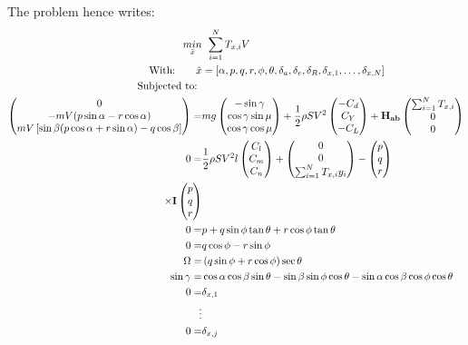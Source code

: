 The problem hence writes:
\begin{align}
\underset{\tilde{x}}{min} & \: \:\sum_{i=1}^{N} T_{x,i} V\\
\text{With:}\qquad \tilde{x}&=[\alpha, p, q, r, \phi, \theta, \delta_a, \delta_e, \delta_R, \delta_{x,1}, \dots, \delta_{x,N}]\\
\text{Subjected to: }&\notag \\
\begin{pmatrix}
0 \\
-mV(p\sin\alpha - r\cos\alpha)\\
mV\left[\sin\beta (p\cos\alpha + r\sin\alpha) - q\cos\beta\right]
\end{pmatrix}
= & mg
\begin{pmatrix}
-\sin\gamma\\
\cos\gamma \sin\mu\\
\cos\gamma \cos\mu	
\end{pmatrix}
+ \frac{1}{2} \rho S V^2
\begin{pmatrix}
-C_d\\
C_Y\\
-C_L
\end{pmatrix}
+ \mathbf{H_{ab}} 
\begin{pmatrix}
\sum_{i=1}^{N} T_{x,i}\\
0\\
0
\end{pmatrix} \\
0 =& \frac{1}{2} \rho S V^2 l
\begin{pmatrix}
C_l\\
C_m\\
C_n
\end{pmatrix}
+
\begin{pmatrix}
0\\
0\\
\sum_{i=1}^{N} T_{x,i} y_i
\end{pmatrix} -
\begin{pmatrix}
p\\
q\\
r
\end{pmatrix}\\
\times \textbf{I}
\begin{pmatrix}
p\\
q\\
r
\end{pmatrix}\\
0= & p + q\sin\phi \tan\theta + r \cos\phi \tan\theta\\
0= & q\cos\phi -r\sin \phi\\
\Omega = & \left( q \sin \phi + r \cos \phi \right) \sec \theta \\
\sin \gamma = & \cos\alpha\cos\beta\sin\theta - \sin\beta\sin\phi\cos\theta - \sin\alpha\cos\beta\cos\phi\cos\theta\\
0 = & \delta_{x,1}\\
\vdots\notag\\
0 = & \delta_{x,j}
\end{align}

